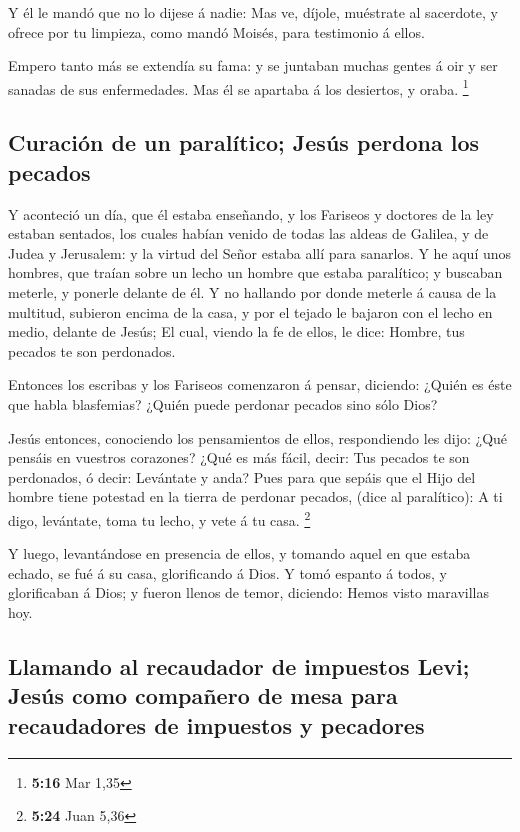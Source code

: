  Y él le mandó que no lo dijese á nadie: Mas ve, díjole,
muéstrate al sacerdote, y ofrece por tu limpieza, como mandó Moisés,
para testimonio á ellos.

 Empero tanto más se extendía su fama: y se juntaban
muchas gentes á oir y ser sanadas de sus enfermedades. 
Mas él se apartaba á los desiertos, y oraba. \footnote{\textbf{5:16} Mar
  1,35}

\hypertarget{curaciuxf3n-de-un-paraluxedtico-jesuxfas-perdona-los-pecados}{%
\subsection{Curación de un paralítico; Jesús perdona los
pecados}\label{curaciuxf3n-de-un-paraluxedtico-jesuxfas-perdona-los-pecados}}

 Y aconteció un día, que él estaba enseñando, y los
Fariseos y doctores de la ley estaban sentados, los cuales habían venido
de todas las aldeas de Galilea, y de Judea y Jerusalem: y la virtud del
Señor estaba allí para sanarlos.  Y he aquí unos hombres,
que traían sobre un lecho un hombre que estaba paralítico; y buscaban
meterle, y ponerle delante de él.  Y no hallando por
donde meterle á causa de la multitud, subieron encima de la casa, y por
el tejado le bajaron con el lecho en medio, delante de Jesús;
 El cual, viendo la fe de ellos, le dice: Hombre, tus
pecados te son perdonados.

 Entonces los escribas y los Fariseos comenzaron á
pensar, diciendo: ¿Quién es éste que habla blasfemias? ¿Quién puede
perdonar pecados sino sólo Dios?

 Jesús entonces, conociendo los pensamientos de ellos,
respondiendo les dijo: ¿Qué pensáis en vuestros corazones?
 ¿Qué es más fácil, decir: Tus pecados te son perdonados,
ó decir: Levántate y anda?  Pues para que sepáis que el
Hijo del hombre tiene potestad en la tierra de perdonar pecados, (dice
al paralítico): A ti digo, levántate, toma tu lecho, y vete á tu casa.
\footnote{\textbf{5:24} Juan 5,36}

 Y luego, levantándose en presencia de ellos, y tomando
aquel en que estaba echado, se fué á su casa, glorificando á Dios.
 Y tomó espanto á todos, y glorificaban á Dios; y fueron
llenos de temor, diciendo: Hemos visto maravillas hoy.

\hypertarget{llamando-al-recaudador-de-impuestos-levi-jesuxfas-como-compauxf1ero-de-mesa-para-recaudadores-de-impuestos-y-pecadores}{%
\subsection{Llamando al recaudador de impuestos Levi; Jesús como
compañero de mesa para recaudadores de impuestos y
pecadores}\label{llamando-al-recaudador-de-impuestos-levi-jesuxfas-como-compauxf1ero-de-mesa-para-recaudadores-de-impuestos-y-pecadores}}

